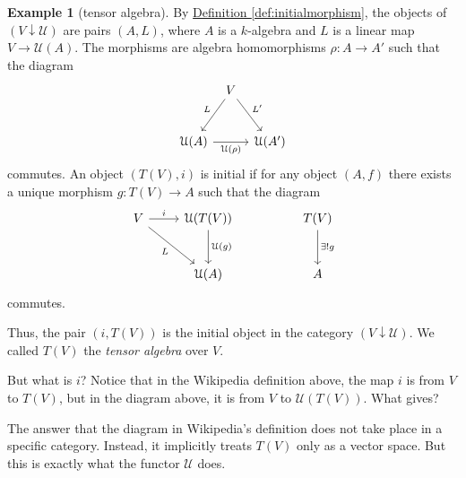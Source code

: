 \documentclass[a4paper,10pt]{scrreprt}
\theoremstyle{definition}
\newtheorem{example}{Example}[section]
\theoremstyle{plain}
\theoremstyle{remark}
\begin{document}
\begin{example}[tensor algebra]
  By \hyperref[def:initialmorphism]{Definition \ref*{def:initialmorphism}}, the objects of $(V \downarrow \mathcal{U})$ are pairs $(A, L)$, where $A$ is a $k$-algebra and $L$ is a linear map $V \to \mathcal{U}(A)$. The morphisms are algebra homomorphisms $\rho\colon A \to A'$ such that the diagram
  \begin{equation*}
    \begin{tikzcd}[column sep=tiny, row sep=6ex]
      & V \arrow[dl, swap, "L"] \arrow[dr, "L'"] & \\
      \mathcal{U}(A) \arrow[rr, swap, "\mathcal{U}(\rho)"] & & \mathcal{U}(A')
    \end{tikzcd}
  \end{equation*}
  commutes. An object $(T(V), i)$ is initial if for any object $(A, f)$ there exists a unique morphism $g\colon T(V) \to A$ such that the diagram
  \begin{equation*}
    \begin{tikzcd}[row sep=large]
      V \arrow[r, "i"] \arrow[dr, swap, "L"] & \mathcal{U}(T(V)) \arrow[d, "\mathcal{U}(g)"] & & T(V) \arrow[d, "\exists!g"] \\
      & \mathcal{U}(A) & & A
    \end{tikzcd}
  \end{equation*}
  commutes.

  Thus, the pair $(i, T(V))$ is the initial object in the category $(V \downarrow \mathcal{U})$. We called $T(V)$ the \emph{tensor algebra} over $V$. 

  But what is $i$? Notice that in the Wikipedia definition above, the map $i$ is from $V$ to $T(V)$, but in the diagram above, it is from $V$ to $\mathcal{U}(T(V))$. What gives?

  The answer that the diagram in Wikipedia's definition does not take place in a specific category. Instead, it implicitly treats $T(V)$ only as a vector space. But this is exactly what the functor $\mathcal{U}$ does.
\end{example}
\end{document}
